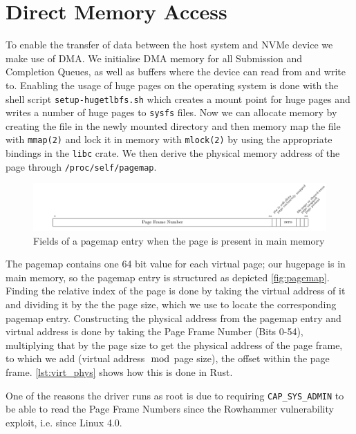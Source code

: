 \section{Direct Memory Access}
To enable the transfer of data between the host system and NVMe device we make use of DMA. We initialise DMA memory for all Submission and Completion Queues, as well as buffers where the device can read from and write to.
Enabling the usage of huge pages on the operating system is done with the shell script \texttt{setup-hugetlbfs.sh} which creates a mount point for huge pages and writes a number of huge pages to \texttt{sysfs} files. Now we can allocate memory by creating the file in the newly mounted directory and then memory map the file with \texttt{mmap(2)} and lock it in memory with \texttt{mlock(2)} by using the appropriate bindings in the \texttt{libc} crate. We then derive the physical memory address of the page through \texttt{/proc/self/pagemap}.

\begin{figure}
  \centering
    \includegraphics[width=\textwidth]{figures/pagemap}
    \caption{Fields of a pagemap entry when the page is present in main memory}
    \label{fig:pagemap}
\end{figure}

The pagemap contains one 64 bit value for each virtual page; our hugepage is in main memory, so the pagemap entry is structured as depicted \autoref{fig:pagemap}. Finding the relative index of the page is done by taking the virtual address of it and dividing it by the the page size, which we use to locate the corresponding pagemap entry. Constructing the physical address from the pagemap entry and virtual address is done by taking the Page Frame Number (Bits 0-54), multiplying that by the page size to get the physical address of the page frame, to which we add (virtual address$\mod$page size), the offset within the page frame. \autoref{lst:virt_phys} shows how this is done in Rust.

One of the reasons the driver runs as root is due to requiring \texttt{CAP_SYS_ADMIN} to be able to read the Page Frame Numbers since the Rowhammer vulnerability exploit, i.e. since Linux 4.0.

